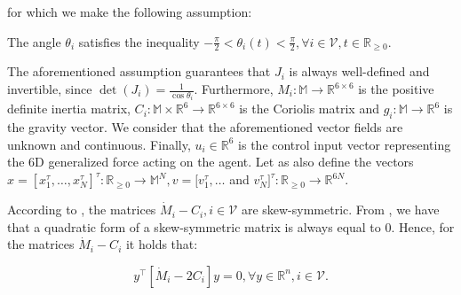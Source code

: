 for which we make the following assumption:

\begin{assumption} \label{as:J}
	The angle $\theta_i$ satisfies the inequality
  $-\frac{\pi}{2} < \theta_i(t) < \frac{\pi}{2} ,\forall i\in\mathcal{V},t\in\mathbb{R}_{\geq 0}$.
\end{assumption}

The aforementioned assumption guarantees that $J_i$ is always well-defined and
invertible, since $\det(J_i) = \tfrac{1}{\cos\theta_i}$.
Furthermore, $M_i:\mathbb{M} \to \mathbb{R}^{6\times6}$ is the positive definite
inertia matrix, $C_i:\mathbb{M}\times\mathbb{R}^6 \to \mathbb{R}^{6\times6}$ is
the Coriolis matrix and $g_i:\mathbb{M} \to \mathbb{R}^6$ is the gravity vector.
We consider that the aforementioned vector fields are unknown and continuous.
Finally, $u_i\in\mathbb{R}^6$ is the control input vector representing the $6$D
generalized force acting on the agent. Let as also define the vectors
$x = [x_1^\tau,\dots,x_N^\tau]^\tau : \mathbb{R}_{\geq 0} \to \mathbb{M}^N, v = [v_1^\tau, \dots$
and $v_N^\tau]^\tau : \mathbb{R}_{\geq 0} \to \mathbb{R}^{6N}$.

\begin{remark}
	According to \cite{Siciliano2009}, the matrices
  $\dot{M}_i-C_i, i \in \mathcal{V}$ are skew-symmetric.
  From \cite{horn_jonshon}, we have that a quadratic form of a skew-symmetric
  matrix is always equal to $0$. Hence, for the matrices $\dot{M}_i-C_i$ it
  holds that:

	\begin{equation} \label{eq:skew_symm}
	y^\top \left[\dot{M}_i - 2 C_i\right]y = 0, \forall y \in \mathbb{R}^n, i \in \mathcal{V}.
	\end{equation}

\end{remark}

